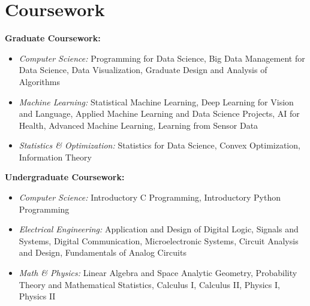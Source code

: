 \documentclass[11pt]{article}
\begin{document}
\section*{Coursework}

\textbf{Graduate Coursework:}

\begin{itemize}
    \item {\textit{Computer Science:}} Programming for Data Science, Big Data Management for Data Science, Data Visualization, Graduate Design and Analysis of Algorithms
    \item {\textit{Machine Learning:}} Statistical Machine Learning, Deep Learning for Vision and Language, Applied Machine Learning and Data Science Projects, AI for Health, Advanced Machine Learning, Learning from Sensor Data
    \item {\textit{Statistics \& Optimization:}} Statistics for Data Science, Convex Optimization, Information Theory
\end{itemize}

\vspace{\lineskip}

\textbf{Undergraduate Coursework:}

\begin{itemize}
    \item {\textit{Computer Science:}} Introductory C Programming, Introductory Python Programming
    \item {\textit{Electrical Engineering:}} Application and Design of Digital Logic, Signals and Systems, Digital Communication, Microelectronic Systems, Circuit Analysis and Design, Fundamentals of Analog Circuits
    \item {\textit{Math \& Physics:}} Linear Algebra and Space Analytic Geometry, Probability Theory and Mathematical Statistics, Calculus I, Calculus II, Physics I, Physics II
\end{itemize}
	
\end{document}
